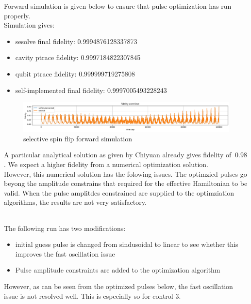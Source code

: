 \documentclass[12pt]{article}
\begin{document}
Forward simulation is given below to ensure that pulse optimization has run properly. 
\\
Simulation gives: 
\begin{itemize}
    \item sesolve final fidelity:  0.9994876128337873
    \item cavity ptrace fidelity:  0.9997184822307845
    \item qubit ptrace fidelity:  0.999999719275808
    \item self-implemented final fidelity:  0.9997005493228243
\end{itemize}
\begin{figure}[H]
    \centering
    \includegraphics[width=0.95\linewidth]{selective_spin_flip_GRAPE_simulation.png}
    \caption{selective spin flip forward simulation}
    \label{fig:selective_spin_flip_forward_simulation}
\end{figure}


A particular analytical solution as given by Chiyuan already gives fidelity of $~0.98$.
            We expect a higher fidelity from a numerical optimization solution. 
\\
However, this numerical solution has the folowing issues.
The optimzied pulses go beyong the amplitude constrains that required for the effective Hamiltonian to be valid. 
When the pulse amplitdes constrained are supplied to the optimziation algorithms, the results are not very satisfactory. 

\\

The following run has two modifications: 
\begin{itemize}
    \item initial guess pulse is changed from sindusoidal to linear to see whether this improves the fast oscillation issue
    \item Pulse amplitude constraints are added to the optimization algorithm
\end{itemize}
However, as can be seen from the optimized pulses below, the fast oscillation issue is not resolved well. 
This is especially so for control 3.
\\
\end{document}
